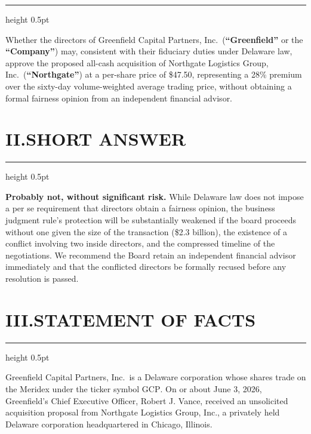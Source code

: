 \documentclass[11pt,letterpaper]{article}
\newcommand{\term}[1]{\textbf{``#1''}}
\begin{document}
{\color{rule}\hrule height 0.5pt}\vspace{6pt}

Whether the directors of Greenfield Capital Partners, Inc.\ (\term{Greenfield} or the \term{Company}) may, consistent with their fiduciary duties under Delaware law, approve the proposed all-cash acquisition of Northgate Logistics Group, Inc.\ (\term{Northgate}) at a per-share price of \$47.50, representing a 28\% premium over the sixty-day volume-weighted average trading price, without obtaining a formal fairness opinion from an independent financial advisor.

\vspace{10pt}

\section*{II.\quad SHORT ANSWER}

{\color{rule}\hrule height 0.5pt}\vspace{6pt}

\textbf{Probably not, without significant risk.} While Delaware law does not impose a per se requirement that directors obtain a fairness opinion, the business judgment rule's protection will be substantially weakened if the board proceeds without one given the size of the transaction (\$2.3 billion), the existence of a conflict involving two inside directors, and the compressed timeline of the negotiations.  We recommend the Board retain an independent financial advisor immediately and that the conflicted directors be formally recused before any resolution is passed.

\vspace{10pt}

\section*{III.\quad STATEMENT OF FACTS}

{\color{rule}\hrule height 0.5pt}\vspace{6pt}

Greenfield Capital Partners, Inc.\ is a Delaware corporation whose shares trade on the Meridex under the ticker symbol \textsc{GCP}.  On or about June 3, 2026, Greenfield's Chief Executive Officer, Robert J. Vance, received an unsolicited acquisition proposal from Northgate Logistics Group, Inc., a privately held Delaware corporation headquartered in Chicago, Illinois.
\end{document}
